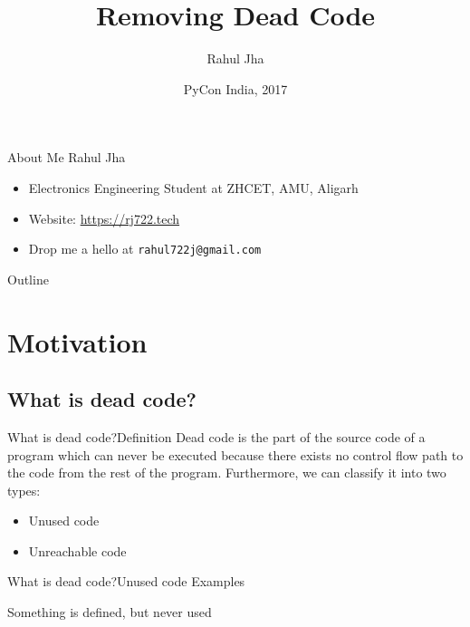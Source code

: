 \documentclass{beamer}
\title{Removing Dead Code}
\author{Rahul Jha}
\date{PyCon India, 2017}
\begin{document}
\begin{frame}
  \titlepage
\end{frame}


\begin{frame}{About Me}
    Rahul Jha
    \begin{itemize}
        \item
        Electronics Engineering Student at ZHCET, AMU, Aligarh
        \item
        Website: \url{https://rj722.tech}
        \item
        Drop me a hello at \texttt{rahul722j@gmail.com}
    \end{itemize}
\end{frame}

\begin{frame}{Outline}
  \tableofcontents
\end{frame}

\section{Motivation}

\subsection{What is dead code?}

\begin{frame}{What is dead code?}{Definition}
    Dead code is the part of the source code of a program which can never be executed because there exists no control flow path to the code from the rest of the program.
    \newline
    \newline
    Furthermore, we can classify it into two types:
    \begin{itemize}
        \item {
            Unused code
        }
        \item {
            Unreachable code
        }
    \end{itemize}

\end{frame}

\begin{frame}{What is dead code?}{Unused code Examples}
    \begin{example}{Something is defined, but never used}
        \inputminted{python}{content/unused_code.py}
    \end{example}   
\end{frame}
\end{document}
